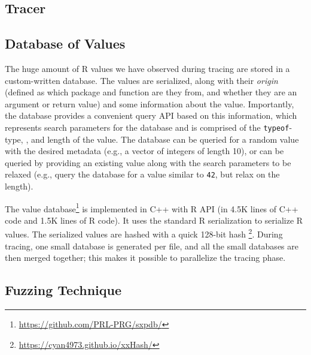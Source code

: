 \documentclass[sigplan,anonymous,review]{acmart}
\begin{document}
\subsection{Tracer}


\subsection{Database of Values}

The huge amount of R values we have observed during tracing are stored in a custom-written database. 
The values are serialized, along with their \textit{origin} (defined as which package and function are they from, and whether they are an argument or return value) and some information about the value. %
Importantly, the database provides a convenient query API based on this information, which represents search parameters for the database and is comprised of the {\tt typeof}-type, , and length of the value. 
The database can be queried for a random value with the desired metadata (e.g., a vector of integers of length 10), or can be queried by providing an existing value along with the search parameters to be relaxed (e.g., query the database for a value similar to {\tt 42}, but relax on the length).

The value database\footnote{\url{https://github.com/PRL-PRG/sxpdb/}  } is implemented in C++ with R API (in 4.5K lines of C++ code and 1.5K lines of R code).
It uses the standard R serialization to serialize R values. 
The serialized values are hashed with a quick 128-bit hash \footnote{\url{https://cyan4973.github.io/xxHash/}}. 
During tracing, one small database is generated per file, and all the small databases are then merged together; this makes it possible to parallelize the tracing phase.

\subsection{Fuzzing Technique }
\end{document}
